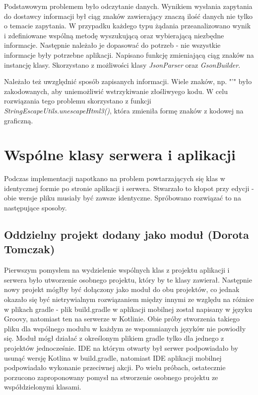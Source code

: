 \documentclass[10pt,twoside,a4paper]{report}
\begin{document}
\par Podstawowym problemem było odczytanie danych. Wynikiem wysłania zapytania do dostawcy informacji był ciąg znaków zawierający znaczą ilość danych nie tylko o temacie zapytania. W przypadku każdego typu żądania przeanalizowano wynik i zdefiniowane wspólną metodę wyszukującą oraz wybierającą niezbędne informacje. Następnie należało je dopasować do potrzeb - nie wszystkie informacje były potrzebne aplikacji. Napisano funkcję zmieniającą ciąg znaków na instancję klasy. Skorzystano z możliwości klasy \textit{JsonParser}\cite{JsonParser} oraz \textit{GsonBuilder}\cite{GsonBuilder}.

\par Należało też uwzględnić sposób zapisanych informacji. Wiele znaków, np. "'" było zakodowanych, aby uniemożliwić wstrzykiwanie złośliwyego kodu. W celu rozwiązania tego problemu skorzystano z funkcji \textit{StringEscapeUtils.unescapeHtml3()}\cite{escapeUtils}, która zmieniła formę znaków z kodowej na graficzną.

\section{Wspólne klasy serwera i aplikacji}
\par Podczas implementacji napotkano na problem powtarzających się klas w identycznej formie po stronie aplikacji i serwera. Stwarzało to kłopot przy edycji - obie wersje pliku musiały być zawsze identyczne. Spróbowano rozwiązać to na następujące sposoby.

\subsection{Oddzielny projekt dodany jako moduł (Dorota Tomczak)}
\par Pierwszym pomysłem na wydzielenie wspólnych klas z projektu aplikacji i serwera było utworzenie osobnego projektu, który by te klasy zawierał. Następnie nowy projekt mógłby być dołączony jako moduł do obu projektów, co jednak okazało się być nietrywialnym rozwiązaniem między innymi ze względu na różnice w plikach gradle - plik build.gradle w aplikacji mobilnej został napisany w języku Groovy, natomiast ten na serwerze w Kotlinie. Obie próby stworzenia takiego pliku dla wspólnego modułu w każdym ze wspomnianych języków nie powiodły się. Moduł mógł działać z określonym plikiem gradle tylko dla jednego z projektów jednocześnie. IDE na którym otwarty był serwer podpowiadało by usunąć wersję Kotlina w build.gradle, natomiast IDE aplikacji mobilnej podpowiadało wykonanie przeciwnej akcji. Po wielu próbach, ostatecznie porzucono zaproponowany pomysł na stworzenie osobnego projektu ze współdzielonymi klasami.
\end{document}
